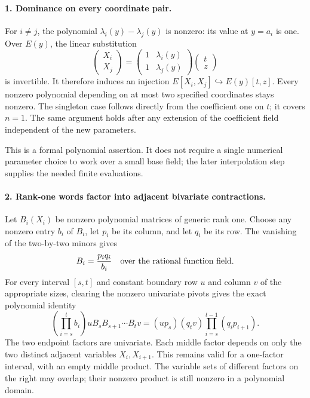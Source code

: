 \paragraph{1. Dominance on every coordinate pair.}
For $i\ne j$, the polynomial $\lambda_i(y)-\lambda_j(y)$ is nonzero:
its value at $y=a_i$ is one. Over $E(y)$, the linear substitution
\[
 \begin{pmatrix}X_i\\X_j\end{pmatrix}
 =\begin{pmatrix}1&\lambda_i(y)\\1&\lambda_j(y)\end{pmatrix}
   \begin{pmatrix}t\\z\end{pmatrix}
 \tag{I.85}
\]
is invertible. It therefore induces an injection
$E[X_i,X_j]\hookrightarrow E(y)[t,z]$. Every nonzero polynomial
depending on at most two specified coordinates stays nonzero.
The singleton case follows directly from the coefficient one on
$t$; it covers $n=1$. The same argument holds after any extension
of the coefficient field independent of the new parameters.

This is a formal polynomial assertion. It does not require a
single numerical parameter choice to work over a small base field;
the later interpolation step supplies the needed finite evaluations.

\paragraph{2. Rank-one words factor into adjacent bivariate contractions.}
Let $B_i(X_i)$ be nonzero polynomial matrices of generic rank one.
Choose any nonzero entry $b_i$ of $B_i$, let $p_i$ be its column,
and let $q_i$ be its row. The vanishing of the two-by-two minors gives
\[
 B_i=\frac{p_iq_i}{b_i}
 \quad\hbox{over the rational function field.}
\]
For every interval $[s,t]$ and constant boundary row $u$ and column
$v$ of the appropriate sizes, clearing the nonzero univariate
pivots gives the exact polynomial identity
\[
 \left(\prod_{i=s}^{t}b_i\right)
       uB_sB_{s+1}\cdots B_tv
 = (up_s)(q_tv)
       \prod_{i=s}^{t-1}(q_ip_{i+1}).
 \tag{I.86}
\]
The two endpoint factors are univariate. Each middle factor depends
on only the two distinct adjacent variables $X_i,X_{i+1}$.
This remains valid for a one-factor interval, with an empty middle
product. The variable sets of different factors on the right may
overlap; their nonzero product is still nonzero in a polynomial
domain.


